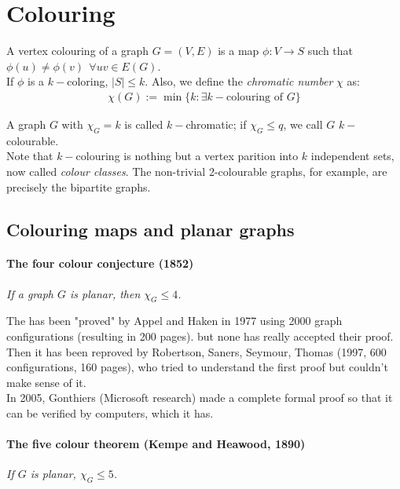 
\chapter{Colouring}
A vertex colouring of a graph $G = (V,E)$ is a map $\phi: V \rightarrow S$ such that $\phi(u) \neq \phi(v) ~~\forall uv \in E(G)$.\\

If $\phi$ is a $k-$coloring, $|S| \leq k$. Also, we define the \textit{chromatic number} $\chi$ as:
\begin{eqnarray}
	\chi (G) := \min \{ k : \exists k-\text{colouring of }G \}
\end{eqnarray}

A graph $G$ with $\chi_{G} = k$ is called $k-$chromatic; if $\chi_{G} \leq q$, we call $G$ $k-$colourable.\\

Note that $k-$colouring is nothing but a vertex parition into $k$ independent sets, now called \textit{colour classes}. The non-trivial 2-colourable graphs, for example, are precisely the bipartite graphs.

	\section{Colouring maps and planar graphs}
		\subsubsection{The four colour conjecture (1852)}
		\textit{If a graph $G$ is planar, then $\chi_{G} \leq 4$.	\\}
		
		The has been "proved" by Appel and Haken in 1977 using 2000 graph configurations (resulting in 200 pages). but none has really accepted their proof. \\
		
		Then it has been reproved by Robertson, Saners, Seymour, Thomas (1997, 600 configurations, 160 pages), who tried to understand the first proof but couldn't make sense of it. \\
		
		In 2005, Gonthiers (Microsoft research) made a complete formal proof so that it can be verified by computers, which it has.
		
		\subsubsection{The five colour theorem (Kempe and Heawood, 1890)}
		\textit{If $G$ is planar, $\chi_{G} \leq 5$.\\}
		
